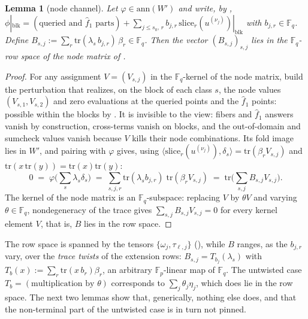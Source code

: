 \documentclass{article}
\newcommand{\Fp}{\mathbb{F}_p}
\newcommand{\Fq}{\mathbb{F}_q}
\newtheorem{lemma}{Lemma}
\theoremstyle{definition}
\begin{document}
\begin{lemma}[node channel]\label{lem:nodechannel}
Let $\varphi \in \mathrm{ann}(W')$ and write, by , $\phi|_{\mathrm{blk}} = (\text{queried and } \hat{f}_1 \text{ parts}) + \sum_{j \leq s_0,\, r} b_{j,r}\, \mathrm{slice}_r(u^{(\nu_j)})|_{\mathrm{blk}}$ with $b_{j,r} \in \Fq$. Define $B_{s, j} := \sum_r \mathrm{tr}(\lambda_s\, b_{j,r})\, \beta_r \in \Fq$. Then the vector $(B_{s,j})_{s,j}$ lies in the $\Fq$-row space of the node matrix of .
\end{lemma}

\begin{proof}
For any assignment $V = (V_{s,j})$ in the $\Fq$-kernel of the node matrix, build the perturbation that realizes, on the block of each class $s$, the node values $(V_{s,1}, V_{s,2})$ and zero evaluations at the queried points and the $\hat{f}_1$ points: possible within the blocks by . It is invisible to the view: fibers and $\hat{f}_1$ answers vanish by construction, cross-terms vanish on blocks, and the out-of-domain and sumcheck values vanish because $V$ kills their node combinations. Its fold image lies in $W'$, and pairing with $\varphi$ gives, using $\langle \mathrm{slice}_r(u^{(\nu_j)}), \delta_s \rangle = \mathrm{tr}(\beta_r V_{s,j})$ and $\mathrm{tr}(x\, \mathrm{tr}(y)) = \mathrm{tr}(x)\mathrm{tr}(y)$:
\[
0 \;=\; \varphi\Big(\sum_s \lambda_s \delta_s\Big) \;=\; \sum_{s, j, r} \mathrm{tr}(\lambda_s b_{j,r})\; \mathrm{tr}(\beta_r V_{s,j}) \;=\; \mathrm{tr}\Big( \sum_{s,j} B_{s,j} V_{s,j} \Big) .
\]
The kernel of the node matrix is an $\Fq$-subspace: replacing $V$ by $\theta V$ and varying $\theta \in \Fq$, nondegeneracy of the trace gives $\sum_{s,j} B_{s,j} V_{s,j} = 0$ for every kernel element $V$, that is, $B$ lies in the row space.
\end{proof}

The row space is spanned by the tensors $\{\omega_j, \tau_{\ell, j}\}$ (), while $B$ ranges, as the $b_{j,r}$ vary, over the \emph{trace twists} of the extension rows: $B_{s,j} = T_{b_j}(\lambda_s)$ with $T_b(x) := \sum_r \mathrm{tr}(x\, b_r) \beta_r$, an arbitrary $\Fp$-linear map of $\Fq$. The untwisted case $T_b = (\text{multiplication by } \theta)$ corresponds to $\sum_j \theta_j \eta_j$, which does lie in the row space. The next two lemmas show that, generically, nothing else does, and that the non-terminal part of the untwisted case is in turn not pinned.
\end{document}
